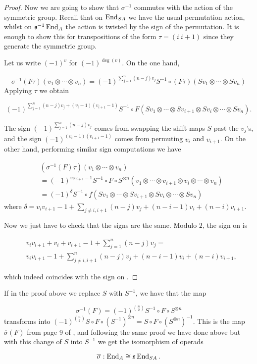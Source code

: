 \documentclass[Thesis.tex]{subfiles}
\begin{document}
\begin{proof}
Now we are going to show that $\sigma^{-1}$ commutes with the action of the symmetric group. Recall that on $\operatorname{End}_{S A}$ we have the usual permutation action, whilst on $\mathfrak{s}^{-1}\operatorname{End}_A$ the action is twisted by the sign of the permutation. It is enough to show this for transpositions of the form $\tau=(i\ i+1)$ since they generate the symmetric group.

Let us write $(-1)^v$ for $(-1)^{\deg(v)}$. On the one hand, 

\[\sigma^{-1}(F\tau)(v_1\otimes\cdots\otimes v_n)=(-1)^{\sum_{j=1}^n (n-j)v_j}S^{-1}\circ (F\tau)(S v_1\otimes\cdots\otimes S v_n)\]
Applying $\tau$ we obtain

\begin{equation}\label{firstmap}
(-1)^{\sum_{j=1}^n (n-j)v_j+(v_i-1)(v_{i+1}-1)}S^{-1}\circ F(S v_1\otimes\cdots\otimes S v_{i+1}\otimes S v_i\otimes\cdots\otimes S v_n).
\end{equation}

The sign $(-1)^{\sum_{j=1}^n (n-j)v_j}$ comes from swapping the shift maps $S$ past the $v_j$'s, and the sign $(-1)^{(v_i-1)(v_{i+1}-1)}$ comes from permuting $v_i$ and $v_{i+1}$. On the other hand, performing similar sign computations we have

\begin{align}\label{secondmap}
&(\sigma^{-1}(F)\tau) (v_1\otimes\cdots\otimes v_n)\\
&=(-1)^{v_iv_{i+1}-1}S^{-1}\circ F\circ S^{\otimes n}(v_1\otimes\cdots\otimes v_{i+1}\otimes v_i\otimes\cdots\otimes v_n)\nonumber\\
&=(-1)^{\delta}S^{-1}\circ f(S v_1\otimes\cdots\otimes S v_{i+1}\otimes S v_i\otimes\cdots\otimes S v_n)\nonumber
\end{align}
where $\delta = v_iv_{i+1}-1+\sum_{j\neq i,i+1}(n-j)v_j +(n-i-1)v_i+(n-i)v_{i+1}$.

Now we just have to check that the signs are the same. Modulo $2$, the sign on  is 

\begin{align*}
&v_iv_{i+1}+v_i+v_{i+1}-1+\sum_{j=1}^n(n-j)v_j=\\
&v_iv_{i+1}-1+\sum_{j\neq i,i+1}^n(n-j)v_j+(n-i-1)v_i+(n-i)v_{i+1},
\end{align*}

which indeed coincides with the sign on .
\end{proof}

\begin{remark}
If in the proof above we replace $S$ with $S^{-1}$, we have that the map

\[\sigma^{-1}(F)=(-1)^{\binom{n}{2}}S^{-1}\circ F\circ S^{\otimes n}\]
 transforms into $(-1)^{\binom{n}{2}}S\circ F\circ (S^{-1})^{\otimes n}=S\circ F\circ (S^{\otimes n})^{-1}$. This is the map $\overline{\sigma}(F)$ from page 9 of \cite{RW}, and following the same proof we have done above but with this change of $S$ into $S^{-1}$ we get the isomorphism of operads

\[
\overline{\sigma}:\operatorname{End}_A\cong\mathfrak{s}\operatorname{End}_{SA}.
\]
\end{remark}
\end{document}
